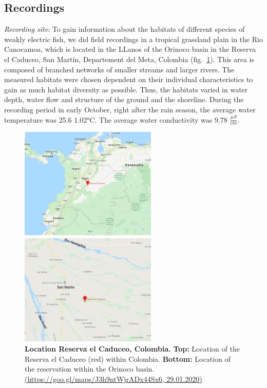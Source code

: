 \subsection{Recordings}
\label{sec:recordings}

\textit{Recording site}: To gain information about the habitats of different species of weakly electric fish, we did field recordings in a tropical grassland plain in the Rio Canocamoa, which is located in the LLanos of the Orinoco basin in the Reserva el Caduceo, San Martín, Departement del Meta, Colombia (fig.~\ref{fig:map}). This area is composed of branched networks of smaller streams and larger rivers.
The measured habitats were chosen dependent on their individual characteristics to gain as much habitat diversity as possible. Thus, the habitats varied in water depth, water flow and structure of the ground and the shoreline. During the recording period in early October, right after the rain season, the average water temperature was 25.6 \rpm \ang{1.02}C. The average water conductivity was 9.78  $\frac{\mu S}{cm}$.

\begin{figure}[H]
    \centering
    \includegraphics[width=0.58\textwidth]{pictures/Methods/map.png}
    \caption{\textbf{Location Reserva el Caduceo, Colombia.} \textbf{Top:} Location of the Reserva el Caduceo (red) within Colombia. \textbf{Bottom:} Location of the reservation within the Orinoco basin. \url{(https://goo.gl/maps/J3h9ntWjrADx44Sx6, 29.01.2020)}}
    \label{fig:map}
\end{figure}{}


